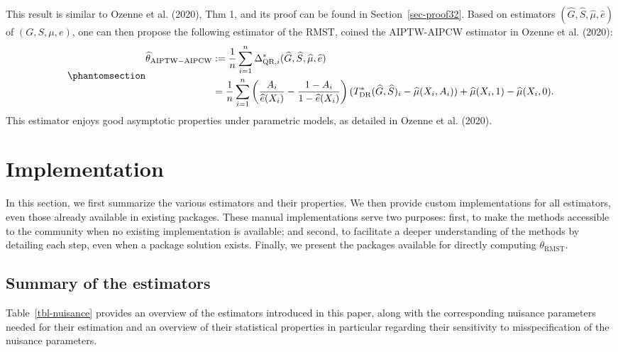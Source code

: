 \documentclass[
  11pt,
  a4paper,
]{article}
\theoremstyle{plain}
\theoremstyle{plain}
\theoremstyle{plain}
\theoremstyle{definition}
\theoremstyle{remark}
\begin{document}
This result is similar to Ozenne et al. (2020), Thm 1, and its proof can
be found in Section~\ref{sec-proof32}. Based on estimators
\((\widehat G, \widehat S, \widehat\mu, \widehat e)\) of
\((G,S,\mu,e)\), one can then propose the following estimator of the
RMST, coined the AIPTW-AIPCW estimator in Ozenne et al. (2020):
\begin{equation}\phantomsection\label{eq-AIPTW_AIPCW}{
\begin{aligned}
\widehat\theta_{\mathrm{AIPTW-AIPCW}} &:= \frac1n \sum_{i=1}^n \Delta_{\mathrm{QR},i}^*(\widehat G, \widehat S, \widehat\mu, \widehat e)
\\
&=\frac1n \sum_{i=1}^n \left(\frac{A_i}{\widehat e(X_i)}-\frac{1-A_i}{1-\widehat e(X_i)}\right)(T^*_{\mathrm{DR}}(\widehat G,\widehat S)_i-\widehat\mu(X_i,A_i)) + \widehat\mu(X_i,1)-\widehat\mu(X_i,0).
\end{aligned}
}\end{equation} This estimator enjoys good asymptotic properties under
parametric models, as detailed in Ozenne et al. (2020).

\section{Implementation}\label{implementation}

In this section, we first summarize the various estimators and their
properties. We then provide custom implementations for all estimators,
even those already available in existing packages. These manual
implementations serve two purposes: first, to make the methods
accessible to the community when no existing implementation is
available; and second, to facilitate a deeper understanding of the
methods by detailing each step, even when a package solution exists.
Finally, we present the packages available for directly computing
\(\theta_{\mathrm{RMST}}\).

\subsection{Summary of the estimators}\label{sec-summary}

Table~\ref{tbl-nuisance} provides an overview of the estimators
introduced in this paper, along with the corresponding nuisance
parameters needed for their estimation and an overview of their
statistical properties in particular regarding their sensitivity to
misspecification of the nuisance parameters.
\end{document}
